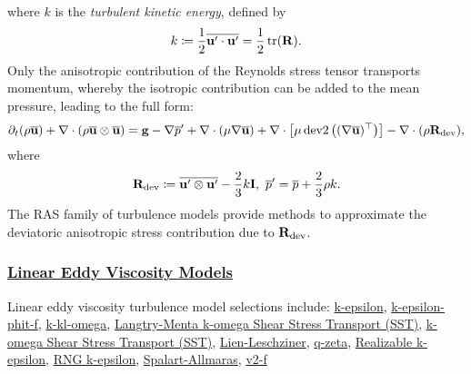 \documentclass{article}
\numberwithin{equation}{section}
\begin{document}
where $k$ is the \textit{turbulent kinetic energy}, defined by
\begin{align*}
	k\coloneqq\frac{1}{2}\overline{{\bf u}'\cdot{\bf u}'} = \frac{1}{2}\operatorname{tr}({\bf R}).
\end{align*}
Only the anisotropic contribution of the Reynolds stress tensor transports momentum, whereby the isotropic contribution can be added to the mean pressure, leading to the full form:
\begin{align*}
	\partial_t(\rho\overline{\bf u}) + \nabla\cdot(\rho\overline{\bf u}\otimes\overline{\bf u}) = {\bf g} - \nabla\overline{p}' + \nabla\cdot(\mu\nabla\overline{\bf u}) + \nabla\cdot\left[\mu\operatorname{dev2}\left((\nabla\overline{\bf u})^\top\right)\right] - \nabla\cdot(\rho{\bf R}_{\rm dev}),
\end{align*}
where
\begin{align*}
	{\bf R}_{\rm dev}\coloneqq\overline{{\bf u}'\otimes{\bf u}'} - \frac{2}{3}k{\bf I},\ \overline{p}' = \overline{p} + \frac{2}{3}\rho k.
\end{align*}
The RAS family of turbulence models provide methods to approximate the deviatoric anisotropic stress contribution due to ${\bf R}_{\rm dev}$.

\subsubsection{\href{https://www.openfoam.com/documentation/guides/latest/doc/guide-turbulence-ras-linear-eddy-viscosity-models.html}{Linear Eddy Viscosity Models}}
Linear eddy viscosity turbulence model selections include: \href{https://www.openfoam.com/documentation/guides/latest/doc/guide-turbulence-ras-k-epsilon.html}{k-epsilon}, \href{https://www.openfoam.com/documentation/guides/latest/doc/guide-turbulence-ras-k-epsilon-phit-f.html}{k-epsilon-phit-f}, \href{https://www.openfoam.com/documentation/guides/latest/doc/guide-turbulence-ras-k-kl-omega.html}{k-kl-omega}, \href{https://www.openfoam.com/documentation/guides/latest/doc/guide-turbulence-ras-k-omega-sst-lm.html}{Langtry-Menta k-omega Shear Stress Transport (SST)}, \href{https://www.openfoam.com/documentation/guides/latest/doc/guide-turbulence-ras-k-omega-sst.html}{k-omega Shear Stress Transport (SST)}, \href{https://www.openfoam.com/documentation/guides/latest/doc/guide-turbulence-ras-lien-leschziner.html}{Lien-Leschziner}, \href{https://www.openfoam.com/documentation/guides/latest/doc/guide-turbulence-ras-q-zeta.html}{q-zeta}, \href{https://www.openfoam.com/documentation/guides/latest/doc/guide-turbulence-ras-realizable-k-epsilon.html}{Realizable k-epsilon}, \href{https://www.openfoam.com/documentation/guides/latest/doc/guide-turbulence-ras-rng-k-epsilon.html}{RNG k-epsilon}, \href{https://www.openfoam.com/documentation/guides/latest/doc/guide-turbulence-ras-spalart-allmaras.html}{Spalart-Allmaras}, \href{https://www.openfoam.com/documentation/guides/latest/doc/guide-turbulence-ras-v2-f.html}{v2-f}
\end{document}
